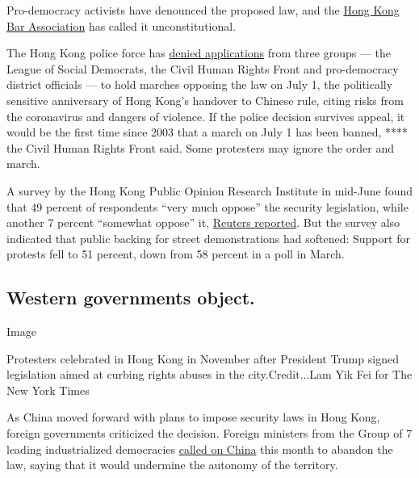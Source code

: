 Pro-democracy activists have denounced the proposed law, and the
\href{https://www.hkba.org/sites/default/files/20200525\%20-\%20Proposal\%20of\%20National\%20People\%27s\%20Congress\%20to\%20enact\%20National\%20Security\%20Law\%20in\%20Hong\%20Kong\%20\%28E\%29.pdf}{Hong
Kong Bar Association} has called it unconstitutional.

The Hong Kong police force has
\href{https://news.rthk.hk/rthk/en/component/k2/1534408-20200627.htm}{denied
applications} from three groups --- the League of Social Democrats, the
Civil Human Rights Front and pro-democracy district officials --- to
hold marches opposing the law on July 1, the politically sensitive
anniversary of Hong Kong's handover to Chinese rule, citing risks from
the coronavirus and dangers of violence. If the police decision survives
appeal, it would be the first time since 2003 that a march on July 1 has
been banned, **** the Civil Human Rights Front said. Some protesters may
ignore the order and march.

A survey by the Hong Kong Public Opinion Research Institute in mid-June
found that 49 percent of respondents ``very much oppose'' the security
legislation, while another 7 percent ``somewhat oppose'' it,
\href{https://www.reuters.com/article/us-hongkong-protests-poll-exclusive/exclusive-support-dips-for-hong-kong-democracy-protests-as-national-security-law-looms-poll-idUSKBN23W3KO}{Reuters
reported}. But the survey also indicated that public backing for street
demonstrations had softened: Support for protests fell to 51 percent,
down from 58 percent in a poll in March.

\hypertarget{western-governments-object}{%
\subsection{Western governments
object.}\label{western-governments-object}}

Image

Protesters celebrated in Hong Kong in November after President Trump
signed legislation aimed at curbing rights abuses in the
city.Credit...Lam Yik Fei for The New York Times

As China moved forward with plans to impose security laws in Hong Kong,
foreign governments criticized the decision. Foreign ministers from the
Group of 7 leading industrialized democracies
\href{https://www.scmp.com/news/china/article/3089494/group-seven-countries-urge-china-reconsider-hong-kong-national-security}{called
on China} this month to abandon the law, saying that it would undermine
the autonomy of the territory.

